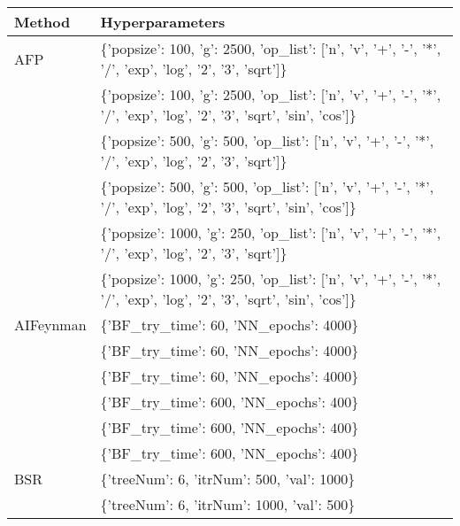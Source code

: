 \begin{tabular}{l p{37em}}
\toprule
   Method &                                                                                                      Hyperparameters \\
\midrule
\midrule
      AFP &               \{'popsize': 100, 'g': 2500, 'op\_list': ['n', 'v', '+', '-', '*', '/', 'exp', 'log', '2', '3', 'sqrt']\} \\
          & \{'popsize': 100, 'g': 2500, 'op\_list': ['n', 'v', '+', '-', '*', '/', 'exp', 'log', '2', '3', 'sqrt', 'sin', 'cos']\} \\
          &                \{'popsize': 500, 'g': 500, 'op\_list': ['n', 'v', '+', '-', '*', '/', 'exp', 'log', '2', '3', 'sqrt']\} \\
          &  \{'popsize': 500, 'g': 500, 'op\_list': ['n', 'v', '+', '-', '*', '/', 'exp', 'log', '2', '3', 'sqrt', 'sin', 'cos']\} \\
          &               \{'popsize': 1000, 'g': 250, 'op\_list': ['n', 'v', '+', '-', '*', '/', 'exp', 'log', '2', '3', 'sqrt']\} \\
          & \{'popsize': 1000, 'g': 250, 'op\_list': ['n', 'v', '+', '-', '*', '/', 'exp', 'log', '2', '3', 'sqrt', 'sin', 'cos']\} \\
\midrule
AIFeynman &                                                                               \{'BF\_try\_time': 60, 'NN\_epochs': 4000\} \\
          &                                                                               \{'BF\_try\_time': 60, 'NN\_epochs': 4000\} \\
          &                                                                               \{'BF\_try\_time': 60, 'NN\_epochs': 4000\} \\
          &                                                                               \{'BF\_try\_time': 600, 'NN\_epochs': 400\} \\
          &                                                                               \{'BF\_try\_time': 600, 'NN\_epochs': 400\} \\
          &                                                                               \{'BF\_try\_time': 600, 'NN\_epochs': 400\} \\
\midrule
      BSR &                                                                           \{'treeNum': 6, 'itrNum': 500, 'val': 1000\} \\
          &                                                                           \{'treeNum': 6, 'itrNum': 1000, 'val': 500\} \\

\end{tabular}
